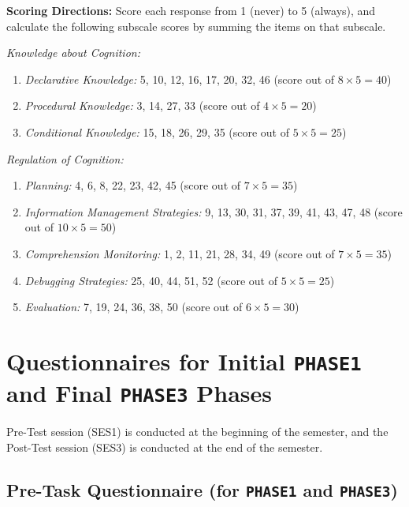 \documentclass[letterpaper, nobind]{templates/ociamthesis}
\providecommand{\tightlist}{%
  \setlength{\itemsep}{0pt}\setlength{\parskip}{0pt}}
\begin{document}
\textbf{Scoring Directions:} Score each response from 1 (never) to 5
(always), and calculate the following subscale scores by summing the
items on that subscale.

\emph{Knowledge about Cognition:}

\begin{enumerate}
\def\labelenumi{\arabic{enumi}.}
\tightlist
\item
  \emph{Declarative Knowledge:} 5, 10, 12, 16, 17, 20, 32, 46 (score out of \(8\times5 = 40\))
\item
  \emph{Procedural Knowledge:} 3, 14, 27, 33 (score out of \(4\times5 = 20\))
\item
  \emph{Conditional Knowledge:} 15, 18, 26, 29, 35 (score out of \(5\times5 = 25\))
\end{enumerate}

\emph{Regulation of Cognition:}

\begin{enumerate}
\def\labelenumi{\arabic{enumi}.}
\tightlist
\item
  \emph{Planning:} 4, 6, 8, 22, 23, 42, 45 (score out of \(7\times5 = 35\))
\item
  \emph{Information Management Strategies:} 9, 13, 30, 31, 37, 39, 41, 43, 47, 48 (score out of \(10\times5 = 50\))
\item
  \emph{Comprehension Monitoring:} 1, 2, 11, 21, 28, 34, 49 (score out of \(7\times5 = 35\))
\item
  \emph{Debugging Strategies:} 25, 40, 44, 51, 52 (score out of \(5\times5 = 25\))
\item
  \emph{Evaluation:} 7, 19, 24, 36, 38, 50 (score out of \(6\times5 = 30\))
\end{enumerate}

\hypertarget{app-phase12}{%
\chapter{\texorpdfstring{Questionnaires for Initial \texttt{PHASE1} and Final \texttt{PHASE3} Phases}{Questionnaires for Initial PHASE1 and Final PHASE3 Phases}}\label{app-phase12}}

Pre-Test session (SES1) is conducted at the beginning of the semester,
and the Post-Test session (SES3) is conducted at the end of the
semester.

\hypertarget{app-phase13-pretask}{%
\section{\texorpdfstring{Pre-Task Questionnaire (for \texttt{PHASE1} and \texttt{PHASE3})}{Pre-Task Questionnaire (for PHASE1 and PHASE3)}}\label{app-phase13-pretask}}
\end{document}
